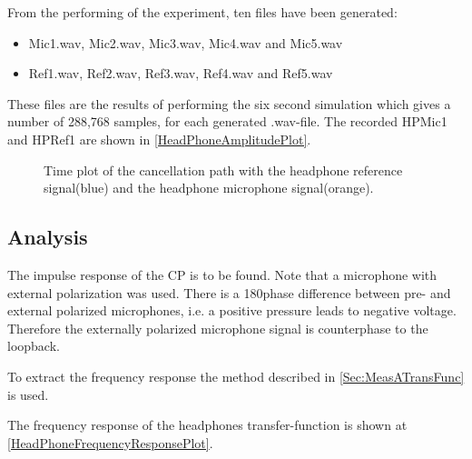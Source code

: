 From the performing of the experiment, ten files have been generated:
\begin{itemize}
	\item Mic1.wav, Mic2.wav, Mic3.wav, Mic4.wav and Mic5.wav
	\item Ref1.wav, Ref2.wav, Ref3.wav, Ref4.wav and Ref5.wav
\end{itemize}

These files are the results of performing the six second simulation which gives a number of 288,768 samples, for each generated .wav-file. 
The recorded HPMic1 and HPRef1 are shown in \autoref{HeadPhoneAmplitudePlot}.


\begin{figure}[H]
	\centering
	
	\caption{Time plot of the cancellation path with the headphone reference signal(blue) and the headphone microphone signal(orange).}
	\label{HeadPhoneAmplitudePlot}
\end{figure}


\subsection{Analysis}
The impulse response of the CP is to be found.
Note that a microphone with external polarization was used. There is a 180\textdegree phase difference between pre- and external polarized microphones, i.e. a positive pressure leads to negative voltage. Therefore the externally polarized microphone signal is counterphase to the loopback. \cite{michandbook}

To extract the frequency response the method described in \autoref{Sec:MeasATransFunc} is used.


The frequency response of the headphones transfer-function is shown at \autoref{HeadPhoneFrequencyResponsePlot}.

